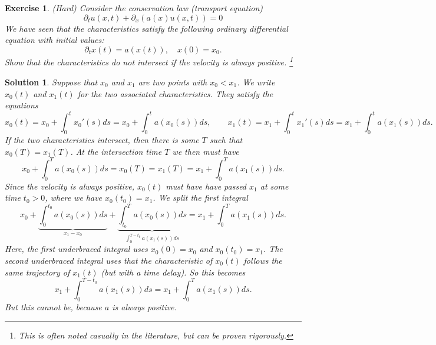 \documentclass[10pt,letterpaper]{article}
\theoremstyle{break}
\newtheorem{exercise}{Exercise}
\newtheorem{mysolution}{Solution}
\newenvironment{solution}{\begin{mysolution}}{\end{mysolution}}
\begin{document}
\begin{exercise}
    (Hard) Consider the conservation law (transport equation)
    $$
        \partial_t u(x,t) + \partial_x\left( a(x) u(x,t) \right) = 0
    $$
    We have seen that the characteristics satisfy the following ordinary differential equation with initial values:
    $$
        \partial_t x(t) = a(x(t)), \quad x(0) = x_0.
    $$
    Show that the characteristics do not intersect if the velocity is always positive. \footnote{This is often noted casually in the literature, but can be proven rigorously.}
\end{exercise}

\begin{solution}
    Suppose that $x_0$ and $x_1$ are two points with $x_0 < x_1$. 
    We write $x_0(t)$ and $x_1(t)$ for the two associated characteristics. 
    They satisfy the equations 
    $$
        x_0(t) = x_0 + \int_0^t x_0'(s) ds = x_0 + \int_0^t a( x_0(s) ) ds,
        \qquad
        x_1(t) = x_1 + \int_0^t x_1'(s) ds = x_1 + \int_0^t a( x_1(s) ) ds.
    $$
    If the two characteristics intersect, 
    then there is some $T$ such that $x_0(T) = x_1(T)$.
    At the intersection time $T$ we then must have 
    $$
        x_0 + \int_0^T a( x_0(s) ) ds
        =
        x_0(T)
        =
        x_1(T)
        =
        x_1 + \int_0^T a( x_1(s) ) ds.
    $$
    Since the velocity is always positive, $x_0(t)$ must have have passed $x_1$ at some time $t_0 > 0$, where we have $x_0(t_0) = x_1$.
    We split the first integral
    $$
        x_0
        +
        \underbrace{ \int_0^{t_0} a( x_0(s) ) ds }_{x_1 - x_0}
        +
        \underbrace{ \int_{t_0}^T a( x_0(s) ) ds }_{\int_0^{T-t_0} a( x_1(s) ) ds}
        =
        x_1
        +
        \int_0^T a( x_1(s) ) ds.
    $$
    Here, the first underbraced integral uses $x_0(0)=x_0$ and $x_0(t_0)=x_1$.
    The second underbraced integral uses that the characteristic of $x_0(t)$ follows the same trajectory of $x_1(t)$ (but with a time delay).
    So this becomes 
    $$
        x_1
        +
        \int_0^{T-t_0} a( x_1(s) ) ds 
        =
        x_1
        +
        \int_0^T a( x_1(s) ) ds.
    $$
    But this cannot be, because $a$ is always positive. 
\end{solution}
    
\end{document}
